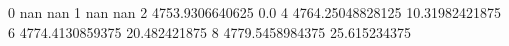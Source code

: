 0 nan nan
1 nan nan
2 4753.9306640625 0.0
4 4764.25048828125 10.31982421875
6 4774.4130859375 20.482421875
8 4779.5458984375 25.615234375
